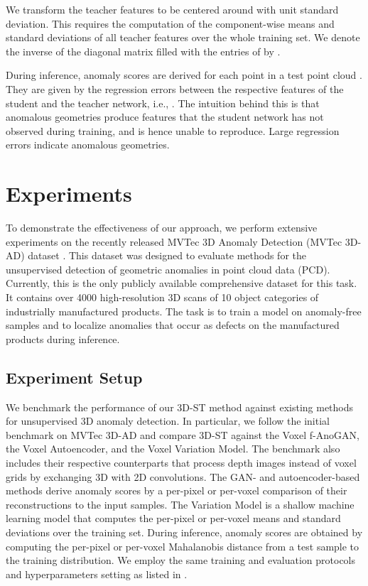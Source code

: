 \documentclass[twoside,11pt]{article}
\newcommand{\methodname}{{3D-ST}}
\begin{document}
We transform the teacher features to be centered around  with unit standard deviation. This requires the computation of the component-wise means  and standard deviations  of all teacher features over the whole training set. We denote the inverse of the diagonal matrix filled with the entries of  by . 

During inference, anomaly scores are derived for each point  in a test point cloud . They are given by the regression errors between the respective features of the student and the teacher network, i.e., . The intuition behind this is that anomalous geometries produce features that the student network has not observed during training, and is hence unable to reproduce. Large regression errors indicate anomalous geometries.

\section{Experiments}
\label{sec:experiments}

To demonstrate the effectiveness of our approach, we perform extensive experiments on the recently released MVTec 3D Anomaly Detection (MVTec 3D-AD) dataset \citep{Bergmann_2022_mvtec_3dad}. This dataset was designed to evaluate methods for the unsupervised detection of geometric anomalies in point cloud data (PCD). Currently, this is the only publicly available comprehensive dataset for this task. It contains over 4000 high-resolution 3D scans of 10 object categories of industrially manufactured products. The task is to train a model on anomaly-free samples and to localize anomalies that occur as defects on the manufactured products during inference.

\subsection{Experiment Setup}

We benchmark the performance of our \methodname{} method against existing methods for unsupervised 3D anomaly detection. In particular, we follow the initial benchmark on MVTec 3D-AD and compare \methodname{} against the Voxel f-AnoGAN, the Voxel Autoencoder, and the Voxel Variation Model. The benchmark also includes their respective counterparts that process depth images instead of voxel grids by exchanging 3D with 2D convolutions. The GAN- and autoencoder-based methods derive anomaly scores by a per-pixel or per-voxel comparison of their reconstructions to the input samples. The Variation Model is a shallow machine learning model that computes the per-pixel or per-voxel means and standard deviations over the training set. During inference, anomaly scores are obtained by computing the per-pixel or per-voxel Mahalanobis distance from a test sample to the training distribution. We employ the same training and evaluation protocols and hyperparameters setting as listed in \citep{Bergmann_2022_mvtec_3dad}.
\end{document}
